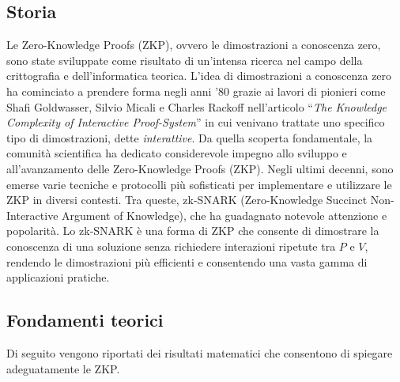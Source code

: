 \documentclass{article}
\theoremstyle{definition}
\begin{document}
\subsection{Storia}
Le Zero-Knowledge Proofs (ZKP), ovvero le dimostrazioni a conoscenza zero, sono state sviluppate come risultato di un'intensa ricerca nel campo della crittografia e dell'informatica teorica. L'idea di dimostrazioni a conoscenza zero ha cominciato a prendere forma negli anni '80 grazie ai lavori di pionieri come Shafi Goldwasser, Silvio Micali e Charles Rackoff nell'articolo ``\emph{The Knowledge Complexity of Interactive Proof-System}''\cite{micali} in cui venivano trattate uno specifico tipo di dimostrazioni, dette \emph{interattive}. 
Da quella scoperta fondamentale, la comunità scientifica ha dedicato considerevole impegno allo sviluppo e all'avanzamento delle Zero-Knowledge Proofs (ZKP). Negli ultimi decenni, sono emerse varie tecniche e protocolli più sofisticati per implementare e utilizzare le ZKP in diversi contesti. Tra queste, zk-SNARK (Zero-Knowledge Succinct Non-Interactive Argument of Knowledge), che ha guadagnato notevole attenzione e popolarità. Lo zk-SNARK è una forma di ZKP che consente di dimostrare la conoscenza di una soluzione senza richiedere interazioni ripetute tra $P$ e $V$, rendendo le dimostrazioni più efficienti e consentendo una vasta gamma di applicazioni pratiche.

\subsection{Fondamenti teorici}
Di seguito vengono riportati dei risultati matematici che consentono di spiegare adeguatamente le ZKP.
\end{document}
